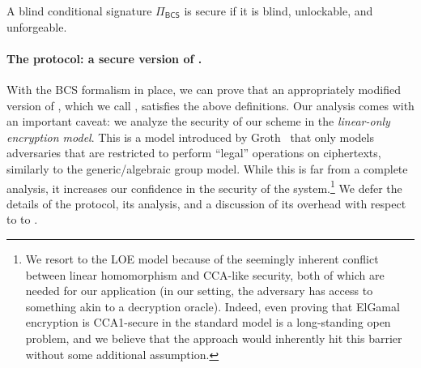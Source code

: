 \begin{definition}[Security]
    A blind conditional signature $\Pi_\mathsf{BCS}$ is secure if it is blind, unlockable, and unforgeable. %
\end{definition}    

\paragraph{The \AALplus protocol: a secure version of \AAL.}
With the BCS formalism in place, we can prove that an appropriately modified version of \AAL, which we call \AALplus, satisfies the above definitions. Our analysis comes with an important caveat: we analyze the security of our scheme in the \emph{linear-only encryption model}. This is a model introduced by Groth~\cite{TCC:Groth04} that only models adversaries that are restricted to perform ``legal'' operations on ciphertexts, similarly to the generic/algebraic group model. While this is far from a complete analysis, it increases our confidence in the security of the system.\footnote{We resort to the LOE model because of the seemingly inherent conflict between linear homomorphism and CCA-like security, both of which are needed for our application (in our setting, the adversary has access to something akin to a decryption oracle). Indeed, even proving that ElGamal encryption is CCA1-secure in the standard model is a long-standing open problem, and we believe that the \AAL approach would inherently hit this barrier without some additional assumption. } We defer the details of the \AALplus protocol, its analysis, and a discussion of its overhead with respect to \AAL to \cite{CCS:GMMMTT22}.

% 

